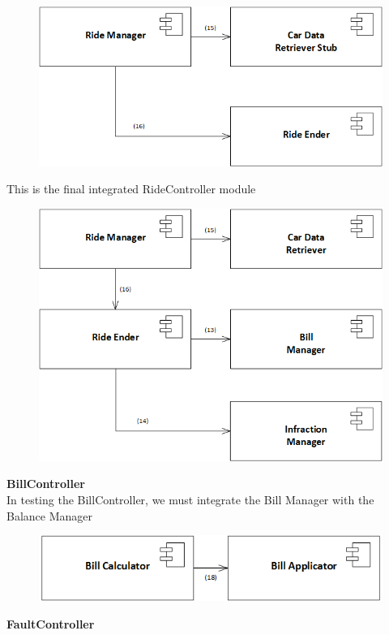 \documentclass{article}
\begin{document}
\begin{figure}[H]
\includegraphics[scale=0.5]{RideController/RideController2}
\centering
\end{figure}
This is the final integrated RideController module
\begin{figure}[H]
\includegraphics[scale=0.5]{RideController/RideControllerIntegration}
\centering
\end{figure}
\textbf{BillController}
\\
In testing the BillController, we must integrate the Bill Manager with the Balance Manager
\begin{figure}[H]
\includegraphics[scale=0.5]{BillController/BillController2}
\centering
\end{figure}
\textbf{FaultController}
\end{document}
